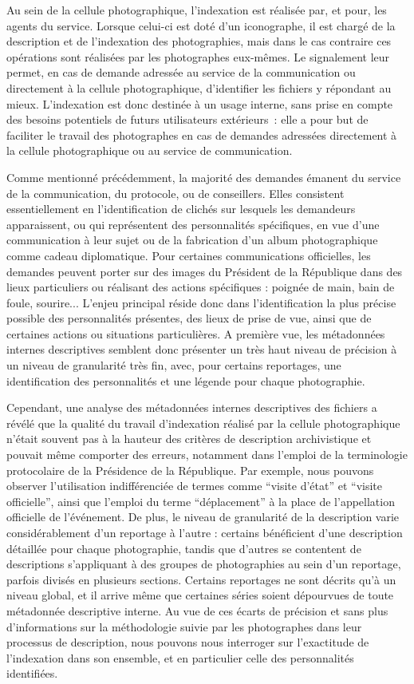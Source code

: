 Au sein de la cellule photographique, l’indexation est réalisée par, et pour, les agents du service. Lorsque celui-ci est doté d’un iconographe, il est chargé de la description et de l’indexation des photographies, mais dans le cas contraire ces opérations sont réalisées par les photographes eux-mêmes. Le signalement leur permet, en cas de demande adressée au service de la communication ou directement à la cellule photographique, d’identifier les fichiers y répondant au mieux. L’indexation est donc destinée à un usage interne, sans prise en compte des besoins potentiels de futurs utilisateurs extérieurs : elle a pour but de faciliter le travail des photographes en cas de demandes adressées directement à la cellule photographique ou au service de communication. 

Comme mentionné précédemment, la majorité des demandes émanent du service de la communication, du protocole, ou de conseillers. Elles consistent essentiellement en l’identification de clichés sur lesquels les demandeurs apparaissent, ou qui représentent des personnalités spécifiques, en vue d’une communication à leur sujet ou de la fabrication d’un album photographique comme cadeau diplomatique. Pour certaines communications officielles, les demandes peuvent porter sur des images du Président de la République dans des lieux particuliers ou réalisant des actions spécifiques : poignée de main, bain de foule, sourire... L’enjeu principal réside donc dans l’identification la plus précise possible des personnalités présentes, des lieux de prise de vue, ainsi que de certaines actions ou situations particulières. A première vue, les métadonnées internes descriptives semblent donc présenter un très haut niveau de précision à un niveau de granularité très fin, avec, pour certains reportages, une identification des personnalités et une légende pour chaque photographie.

Cependant, une analyse des métadonnées internes descriptives des fichiers a révélé que la qualité du travail d’indexation réalisé par la cellule photographique n’était souvent pas à la hauteur des critères de description archivistique et pouvait même comporter des erreurs, notamment dans l’emploi de la terminologie protocolaire de la Présidence de la République. Par exemple, nous pouvons observer l’utilisation indifférenciée de termes comme \enquote{visite d’état} et \enquote{visite officielle}, ainsi que l’emploi du terme \enquote{déplacement} à la place de l’appellation officielle de l’événement. De plus, le niveau de granularité de la description varie considérablement d'un reportage à l'autre : certains bénéficient d'une description détaillée pour chaque photographie, tandis que d'autres se contentent de descriptions s'appliquant à des groupes de photographies au sein d'un reportage, parfois divisés en plusieurs sections. Certains reportages ne sont décrits qu'à un niveau global, et il arrive même que certaines séries soient dépourvues de toute métadonnée descriptive interne. Au vue de ces écarts de précision et sans plus d’informations sur la méthodologie suivie par les photographes dans leur processus de description, nous pouvons nous interroger sur l’exactitude de l’indexation dans son ensemble, et en particulier celle des personnalités identifiées. 

